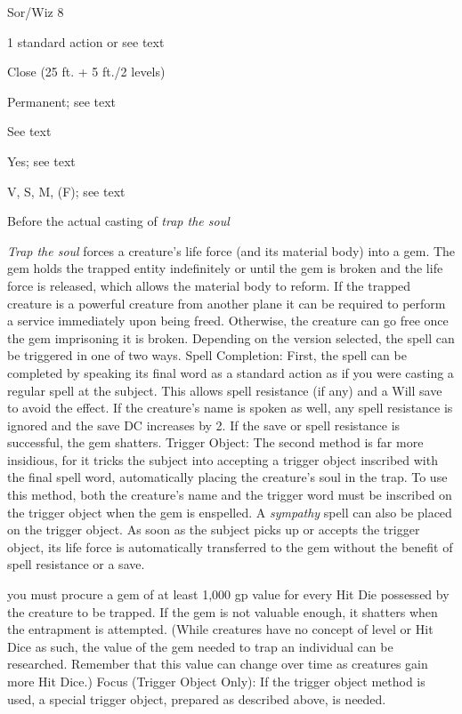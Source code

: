 
\begin{description*}
\item[Level:] Sor/Wiz 8
\item[Casting Time:] 1 standard action or see text
\item[Range:] Close (25 ft. + 5 ft./2 levels)
\item[Duration:] Permanent; see text
\item[Saving Throw:] See text
\item[Spell Resistance:] Yes; see text
\item[Components:] V, S, M, (F); see text
\item[Arcane Material Component:] Before the actual casting of \textit{trap the soul}
\end{description*}

\textit{Trap the soul} forces a creature's life force (and its material body) into
a gem. The gem holds the trapped entity indefinitely or until the gem is broken
and the life force is released, which allows the material body to reform. If the
trapped creature is a powerful creature from another plane it can be required to
perform a service immediately upon being freed. Otherwise, the creature can go
free once the gem imprisoning it is broken.
Depending on the version selected, the spell can be triggered in one of two ways.
Spell Completion: First, the spell can be completed by speaking its final
word as a standard action as if you were casting a regular spell at the subject.
This allows spell resistance (if any) and a Will save to avoid the effect. If the
creature's name is spoken as well, any spell resistance is ignored and the save
DC increases by 2. If the save or spell resistance is successful, the gem shatters.
Trigger Object: The second method is far more insidious, for it tricks
the subject into accepting a trigger object inscribed with the final spell word,
automatically placing the creature's soul in the trap. To use this method, both
the creature's name and the trigger word must be inscribed on the trigger object
when the gem is enspelled. A \textit{sympathy} spell can also be placed on the
trigger object. As soon as the subject picks up or accepts the trigger object,
its life force is automatically transferred to the gem without the benefit of spell
resistance or a save.

you must procure a gem of at least 1,000 gp value for every Hit Die possessed
by the creature to be trapped. If the gem is not valuable enough, it shatters when
the entrapment is attempted. (While creatures have no concept of level or Hit Dice
as such, the value of the gem needed to trap an individual can be researched. Remember
that this value can change over time as creatures gain more Hit Dice.)
Focus (Trigger Object Only): If the trigger object method is used, a special
trigger object, prepared as described above, is needed.